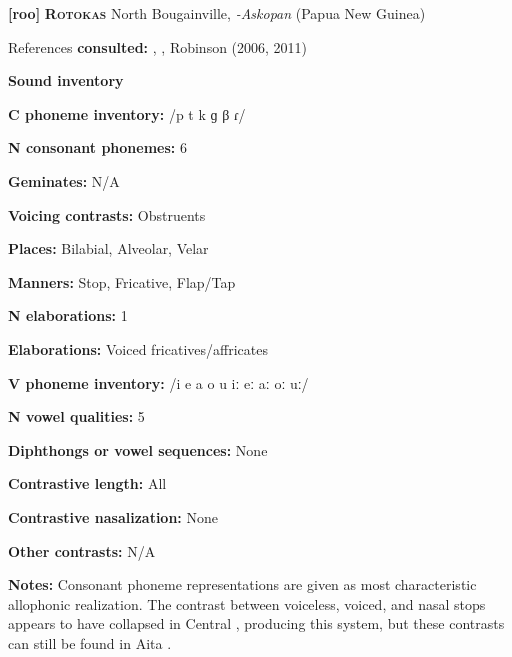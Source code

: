 \textbf{[roo]}   \textbf{\textsc{Rotokas}}  North Bougainville, \textit{-Askopan} (Papua New Guinea)



References \textbf{consulted:} \citet{FirchowFirchow1969}, \citet{FirchowEtAl1973}, Robinson (2006, 2011) 



\textbf{Sound inventory}



\textbf{C phoneme inventory:} /p t k ɡ β ɾ/



\textbf{N consonant phonemes:} 6



\textbf{Geminates:} N/A



\textbf{Voicing contrasts:} Obstruents



\textbf{Places:} Bilabial, Alveolar, Velar



\textbf{Manners:} Stop, Fricative, Flap/Tap



\textbf{N elaborations:} 1



\textbf{Elaborations:} Voiced fricatives/affricates



\textbf{V phoneme inventory:} /i e a o u iː eː aː oː uː/



\textbf{N vowel qualities:} 5



\textbf{Diphthongs or vowel sequences:} None



\textbf{Contrastive length:} All



\textbf{Contrastive nasalization:} None



\textbf{Other contrasts:} N/A



\textbf{Notes:} Consonant phoneme representations are given as most characteristic allophonic realization. The contrast between voiceless, voiced, and nasal stops appears to have collapsed in Central , producing this system, but these contrasts can still be found in Aita  \citep{Robinson2006}.



